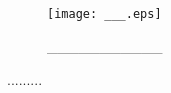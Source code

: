 
\begin{center}
\begin{figure}[h!]
\texttt{[image: \_\_\_.eps]}
\caption{___________}
\label{______}
\end{figure}
\end{center}

\begin{center}
\begin{table}[h!]
\begin{tabular}{.........}
%
%
\end{tabular}
\caption{___________}
\label{__________}
\end{table}
\end{center}
